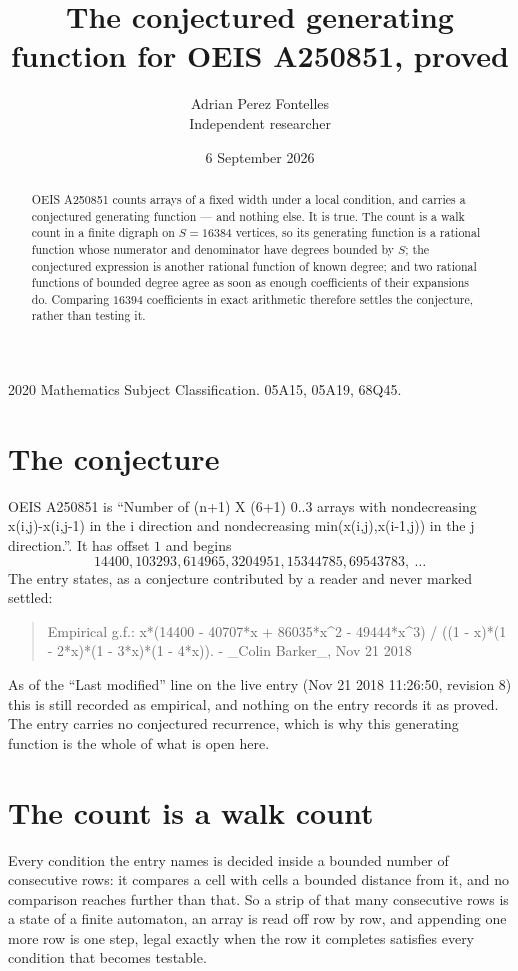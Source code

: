\documentclass[11pt,a4paper]{article}
\title{The conjectured generating function for OEIS A250851, proved}
\author{Adrian Perez Fontelles\\ \small Independent researcher}
\date{6 September 2026}
\theoremstyle{plain}
\theoremstyle{definition}
\begin{document}
\maketitle

\begin{abstract}
OEIS A250851 counts arrays of a fixed width under a local condition, and carries a conjectured
generating function --- and nothing else. It is true. The count is a walk count in a finite
digraph on $S=16384$ vertices, so its generating function is a rational function whose numerator
and denominator have degrees bounded by $S$; the conjectured expression is another rational
function of known degree; and two rational functions of bounded degree agree as soon as enough
coefficients of their expansions do. Comparing $16394$ coefficients in exact arithmetic
therefore settles the conjecture, rather than testing it.
\end{abstract}

\noindent\small 2020 Mathematics Subject Classification. 05A15, 05A19, 68Q45.\normalsize

\section{The conjecture}

OEIS A250851 is ``Number of (n+1) X (6+1) 0..3 arrays with nondecreasing x(i,j)-x(i,j-1) in the i direction and nondecreasing min(x(i,j),x(i-1,j)) in the j direction.''. It has offset $1$ and begins
\[
14400, 103293, 614965, 3204951, 15344785, 69543783,\ \dots
\]
The entry states, as a conjecture contributed by a reader and never marked settled:
\begin{quote}
Empirical g.f.: x*(14400 - 40707*x + 86035*x\^{}2 - 49444*x\^{}3) / ((1 - x)*(1 - 2*x)*(1 - 3*x)*(1 - 4*x)). - \_Colin Barker\_, Nov 21 2018
\end{quote}
As of the ``Last modified'' line on the live entry (Nov 21 2018 11:26:50, revision 8) this is still
recorded as empirical, and nothing on the entry records it as proved. The entry carries no
conjectured recurrence, which is why this generating function is the whole of what is open
here.

\section{The count is a walk count}

Every condition the entry names is decided inside a bounded number of consecutive rows: it
compares a cell with cells a bounded distance from it, and no comparison reaches further than
that. So a strip of that many consecutive rows is a state of a finite automaton, an array is
read off row by row, and appending one more row is one step, legal exactly when the row it
completes satisfies every condition that becomes testable.
\end{document}
